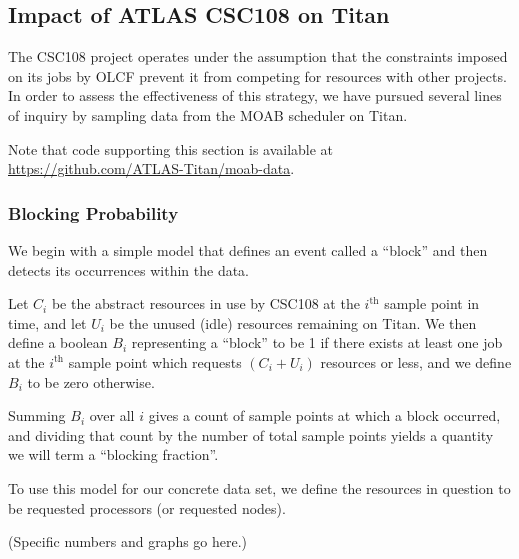 \subsection{Impact of ATLAS CSC108 on Titan}
\label{subsec:csc108}

The CSC108 project operates under the assumption that the constraints imposed
on its jobs by OLCF prevent it from competing for resources with other
projects. In order to assess the effectiveness of this strategy, we have
pursued several lines of inquiry by sampling data from the MOAB scheduler on
Titan.

Note that code supporting this section is available at
\url{https://github.com/ATLAS-Titan/moab-data}. 

\subsubsection{Blocking Probability}
\label{subsubsec:blockingprobability}

We begin with a simple model that defines an event called a ``block'' and then
detects its occurrences within the data.

Let $C_i$ be the abstract resources in use by CSC108 at the $i^{\text{th}}$
sample point in time, and let $U_i$ be the unused (idle) resources remaining on
Titan. We then define a boolean $B_i$ representing a ``block'' to be 1 if there
exists at least one job at the $i^{\text{th}}$ sample point which requests
$(C_i + U_i)$ resources or less, and we define $B_i$ to be zero otherwise.

Summing $B_i$ over all $i$ gives a count of sample points at which a block
occurred, and dividing that count by the number of total sample points yields a
quantity we will term a ``blocking fraction''.

To use this model for our concrete data set, we define the resources in
question to be requested processors (or requested nodes).

(Specific numbers and graphs go here.)

